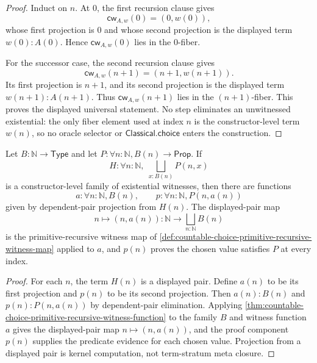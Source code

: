 \begin{proof}
Induct on $n$. At $0$, the first recursion clause gives
$$
\mathsf{cw}_{A,w}(0)=(0,w(0)),
$$
whose first projection is $0$ and whose second projection is the displayed term $w(0):A(0)$. Hence $\mathsf{cw}_{A,w}(0)$ lies in the $0$-fiber.

For the successor case, the second recursion clause gives
$$
\mathsf{cw}_{A,w}(n+1)=(n+1,w(n+1)).
$$
Its first projection is $n+1$, and its second projection is the displayed term $w(n+1):A(n+1)$. Thus $\mathsf{cw}_{A,w}(n+1)$ lies in the $(n+1)$-fiber. This proves the displayed universal statement. No step eliminates an unwitnessed existential: the only fiber element used at index $n$ is the constructor-level term $w(n)$, so no oracle selector or $\mathsf{Classical.choice}$ enters the construction.
\end{proof}

\begin{corollary}
\label{cor:witnessed-countable-choice-for-predicates}
Let $B:\mathbb{N}\to\mathsf{Type}$ and let $P:\forall n:\mathbb{N},B(n)\to\mathsf{Prop}$. If
$$
H:\forall n:\mathbb{N},\;\bigsqcup_{x:B(n)}P(n,x)
$$
is a constructor-level family of existential witnesses, then there are functions
$$
a:\forall n:\mathbb{N},B(n),\qquad p:\forall n:\mathbb{N},P(n,a(n))
$$
given by dependent-pair projection from $H(n)$. The displayed-pair map
$$
n\mapsto (n,a(n)):\mathbb{N}\to\bigsqcup_{n:\mathbb{N}}B(n)
$$
is the primitive-recursive witness map of \autoref{def:countable-choice-primitive-recursive-witness-map} applied to $a$, and $p(n)$ proves the chosen value satisfies $P$ at every index.
\end{corollary}

\begin{proof}
For each $n$, the term $H(n)$ is a displayed pair. Define $a(n)$ to be its first projection and $p(n)$ to be its second projection. Then $a(n):B(n)$ and $p(n):P(n,a(n))$ by dependent-pair elimination. Applying \autoref{thm:countable-choice-primitive-recursive-witness-function} to the family $B$ and witness function $a$ gives the displayed-pair map $n\mapsto(n,a(n))$, and the proof component $p(n)$ supplies the predicate evidence for each chosen value. Projection from a displayed pair is kernel computation, not term-stratum meta closure.
\end{proof}

